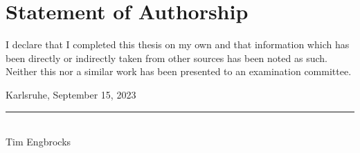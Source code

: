 \chapter*{Statement of Authorship}
\thispagestyle{empty}

\vspace*{4cm}




I declare that I completed this thesis on my own and that information which has been directly or indirectly taken from other sources has been noted as such.
Neither this nor a similar work has been presented to an examination committee.

\bigskip
\bigskip
\bigskip

Karlsruhe, September 15, 2023

\bigskip
\bigskip
\bigskip

\rule{0.3\textwidth}{0.4pt}\\
Tim Engbrocks